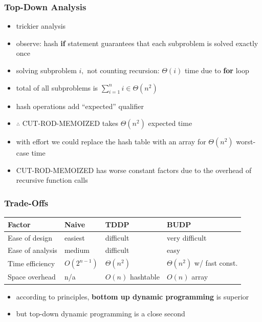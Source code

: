 \documentclass{beamer}
\begin{document}
\begin{frame} \frametitle{Top-Down Analysis}
    \begin{itemize}
      \item trickier analysis
      \item observe: hash \textbf{if} statement guarantees that each subproblem is solved exactly once
      \item solving subproblem $i,$ not counting recursion: $\Theta(i)$ time due to \textbf{for} loop
      \item total of all subproblems is $\sum_{i=1}^n i \in \Theta(n^2)$
      \item hash operations add ``expected'' qualifier
      \item $\therefore$ CUT-ROD-MEMOIZED takes $\Theta(n^2)$ expected time
      \item with effort we could replace the hash table with an array for $\Theta(n^2)$ worst-case time
      \item CUT-ROD-MEMOIZED has worse constant factors due to the overhead of recursive function calls
    \end{itemize}
\end{frame}

\begin{frame} \frametitle{Trade-Offs}
\begin{center}
  \begin{tabular}{llll}
    \textbf{Factor} & \textbf{Naive} & \textbf{TDDP} & \textbf{BUDP} \\ \hline
    Ease of design & easiest & difficult & very difficult \\
    Ease of analysis & medium & difficult & easy \\
    Time efficiency & $O(2^{n-1})$ & $\Theta(n^2)$ & $\Theta(n^2)$ w/ fast const. \\
    Space overhead & n/a & $O(n)$ hashtable & $O(n)$ array \\
  \end{tabular}
\end{center}

\begin{itemize}
  \item according to principles, \textbf{bottom up dynamic programming} is superior
  \item but top-down dynamic programming is a close second
\end{itemize}
\end{frame}
\end{document}
